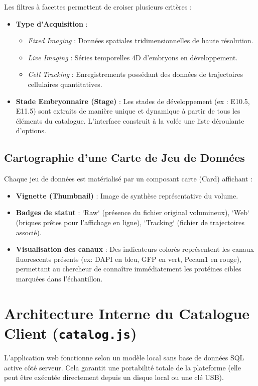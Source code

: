 Les filtres à facettes permettent de croiser plusieurs critères :
\begin{itemize}
    \item \textbf{Type d'Acquisition} :
        \begin{itemize}
            \item \textit{Fixed Imaging} : Données spatiales tridimensionnelles de haute résolution.
            \item \textit{Live Imaging} : Séries temporelles 4D d'embryons en développement.
            \item \textit{Cell Tracking} : Enregistrements possédant des données de trajectoires cellulaires quantitatives.
        \end{itemize}
    \item \textbf{Stade Embryonnaire (Stage)} : Les stades de développement (ex : E10.5, E11.5) sont extraits de manière unique et dynamique à partir de tous les éléments du catalogue. L'interface construit à la volée une liste déroulante d'options.
\end{itemize}

\subsection{Cartographie d'une Carte de Jeu de Données}

Chaque jeu de données est matérialisé par un composant carte (Card) affichant :
\begin{itemize}
    \item \textbf{Vignette (Thumbnail)} : Image de synthèse représentative du volume.
    \item \textbf{Badges de statut} : `Raw` (présence du fichier original volumineux), `Web` (briques prêtes pour l'affichage en ligne), `Tracking` (fichier de trajectoires associé).
    \item \textbf{Visualisation des canaux} : Des indicateurs colorés représentent les canaux fluorescents présents (ex: DAPI en bleu, GFP en vert, Pecam1 en rouge), permettant au chercheur de connaître immédiatement les protéines cibles marquées dans l'échantillon.
\end{itemize}

\section{Architecture Interne du Catalogue Client (\texttt{catalog.js})}

L'application web fonctionne selon un modèle local sans base de données SQL active côté serveur. Cela garantit une portabilité totale de la plateforme (elle peut être exécutée directement depuis un disque local ou une clé USB).

